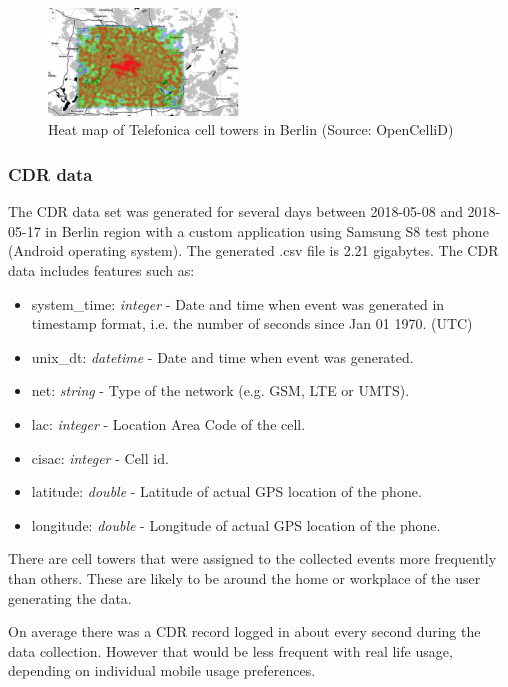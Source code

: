 \begin{figure}[h]
    \includegraphics[width=0.45\textwidth]{images/opencellid.png}
    \caption{Heat map of Telefonica cell towers in Berlin (Source: OpenCelliD) }
    \label{fig:opencellid}
\end{figure}

\subsubsection{CDR data}
The CDR data set was generated for several days between 2018-05-08 and 2018-05-17 in Berlin region with a custom application using Samsung S8 test phone (Android operating system). The generated .csv file is 2.21 gigabytes. The CDR data includes features such as:
\begin{itemize}
\item system\_time: \textit{integer} - Date and time when event was generated in timestamp format, i.e. the number of seconds since Jan 01 1970. (UTC)
\item unix\_dt: \textit{datetime} - Date and time when event was generated.
\item net: \textit{string} - Type of the network (e.g. GSM, LTE or UMTS).
\item lac: \textit{integer} - Location Area Code of the cell.
\item cisac: \textit{integer} - Cell id.
\item latitude: \textit{double} - Latitude of actual GPS location of the phone.
\item longitude: \textit{double} - Longitude of actual GPS location of the phone.
\end{itemize}

There are cell towers that were assigned to the collected events more frequently than others. These are likely to be around the home or workplace of the user generating the data.

On average there was a CDR record logged in about every second during the data collection. However that would be less frequent with real life usage, depending on individual mobile usage preferences. 

